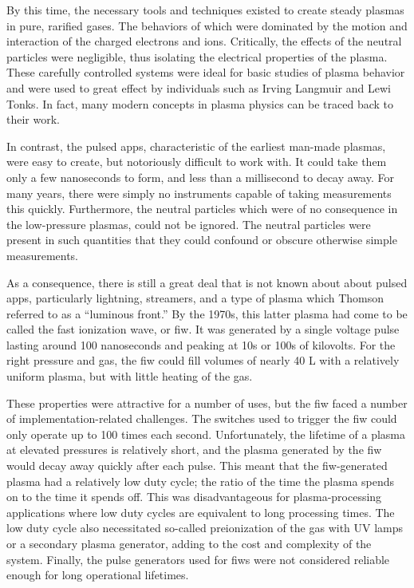 By this time, the necessary tools and techniques existed to create steady
plasmas in pure, rarified gases. The behaviors of which were dominated by the
motion and interaction of the charged electrons and ions. Critically, the
effects of the neutral particles were negligible, thus isolating the electrical
properties of the plasma. These carefully controlled systems were ideal for
basic studies of plasma behavior and were used to great effect by individuals
such as Irving Langmuir and Lewi Tonks. In fact, many modern concepts in plasma
physics can be traced back to their work.

In contrast, the pulsed \acs{app}s, characteristic of the earliest man-made
plasmas, were easy to create, but notoriously difficult to work with. It could
take them only a few nanoseconds to form, and less than a millisecond to decay
away. For many years, there were simply no instruments capable of taking
measurements this quickly. Furthermore, the neutral particles which were of no
consequence in the low-pressure plasmas, could not be ignored. The neutral
particles were present in such quantities that they could confound or obscure
otherwise simple measurements.

As a consequence, there is still a great deal that is not known about about
pulsed \acs{app}s, particularly lightning, streamers, and a type of plasma which
Thomson referred to as a ``luminous front.'' By the 1970s, this latter plasma
had come to be called the fast ionization wave, or \acs{fiw}. It was generated
by a single voltage pulse lasting around 100 nanoseconds and peaking at 10s or
100s of kilovolts. For the right pressure and gas, the \acs{fiw} could fill
volumes of nearly 40 L with a relatively uniform plasma, but with little heating
of the gas.

These properties were attractive for a number of uses, but the \acs{fiw} faced a
number of implementation-related challenges. The switches used to trigger the
\acs{fiw} could only operate up to 100 times each second. Unfortunately, the
lifetime of a plasma at elevated pressures is relatively short, and the plasma
generated by the \acs{fiw} would decay away quickly after each pulse. This meant
that the \acs{fiw}-generated plasma had a relatively low duty cycle; the ratio
of the time the plasma spends on to the time it spends off. This was
disadvantageous for plasma-processing applications where low duty cycles are
equivalent to long processing times. The low duty cycle also necessitated
so-called preionization of the gas with UV lamps or a secondary plasma
generator, adding to the cost and complexity of the system. Finally, the pulse
generators used for \acs{fiw}s were not considered reliable enough for long
operational lifetimes.

